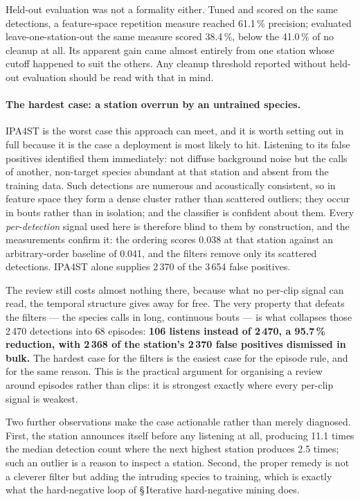 \documentclass[final,3p,times]{elsarticle}
\begin{document}
Held-out evaluation was not a formality either. Tuned and scored on the same
detections, a feature-space repetition measure reached 61.1\,\% precision;
evaluated leave-one-station-out the same measure scored 38.4\,\%, below the
41.0\,\% of no cleanup at all. Its apparent gain came almost entirely from one
station whose cutoff happened to suit the others. Any cleanup threshold
reported without held-out evaluation should be read with that in mind.

\paragraph{The hardest case: a station overrun by an untrained species.}
IPA4ST is the worst case this approach can meet, and it is worth setting out in
full because it is the case a deployment is most likely to hit. Listening to its
false positives identified them immediately: not diffuse background noise but
the calls of another, non-target species abundant at that station and absent
from the training data. Such detections are numerous and acoustically
consistent, so in feature space they form a dense cluster rather than scattered
outliers; they occur in bouts rather than in isolation; and the classifier is
confident about them. Every \emph{per-detection} signal used here is therefore
blind to them by construction, and the measurements confirm it: the ordering
scores 0.038 at that station against an arbitrary-order baseline of 0.041, and
the filters remove only its scattered detections. IPA4ST alone supplies 2\,370
of the 3\,654 false positives.

The review still costs almost nothing there, because what no per-clip signal
can read, the temporal structure gives away for free. The very property that
defeats the filters --- the species calls in long, continuous bouts --- is what
collapses those 2\,470 detections into 68 episodes: \textbf{106 listens instead
of 2\,470, a 95.7\,\% reduction, with 2\,368 of the station's 2\,370 false
positives dismissed in bulk.} The hardest case for the filters is the easiest
case for the episode rule, and for the same reason. This is the practical
argument for organising a review around episodes rather than clips: it is
strongest exactly where every per-clip signal is weakest.

Two further observations make the case actionable rather than merely
diagnosed. First, the station announces itself before any listening at all,
producing 11.1 times the median detection count where the next highest station
produces 2.5 times; such an outlier is a reason to inspect a station. Second,
the proper remedy is not a cleverer filter but adding the intruding species to
training, which is exactly what the hard-negative loop of \S\,Iterative
hard-negative mining does.
\end{document}
